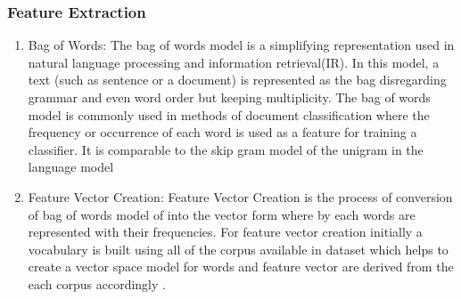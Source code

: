 \subsubsection{Feature Extraction}
\begin{enumerate}
\item Bag of Words:
 The bag of words model is a simplifying representation used in natural language processing and information retrieval(IR). In this model, a text (such as sentence or a document) is represented as the bag disregarding grammar and even word order but keeping multiplicity. The bag of words model is commonly used in methods of document classification where the frequency or occurrence of each word is used as a feature for training a classifier. It is comparable to the skip gram model of the unigram in the language model \cite{vector}


\item Feature Vector Creation:
 Feature Vector Creation is the process of conversion of bag of words model of into the vector form where by each words are represented with their frequencies. For feature vector creation initially a vocabulary is built using all of the corpus available in dataset which helps to create a vector space model for words and feature vector are derived from the each corpus accordingly \cite{vector}.
\end{enumerate}

